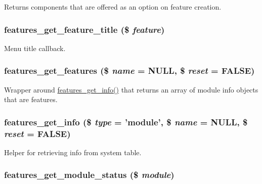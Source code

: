 \label{features_8module_a714c640c4e8c11ee30eacc1510415598}
Returns components that are offered as an option on feature creation. \hypertarget{features_8module_aa4ba0e8b4f0d7640d95ea12d67928ca3}{
\subsubsection[{features\_\-get\_\-feature\_\-title}]{\setlength{\rightskip}{0pt plus 5cm}features\_\-get\_\-feature\_\-title (\$ {\em feature})}}
\label{features_8module_aa4ba0e8b4f0d7640d95ea12d67928ca3}
Menu title callback. \hypertarget{features_8module_a2bb9e3cf366b99818c231091b8fea3cd}{
\subsubsection[{features\_\-get\_\-features}]{\setlength{\rightskip}{0pt plus 5cm}features\_\-get\_\-features (\$ {\em name} = {\ttfamily NULL}, \/  \$ {\em reset} = {\ttfamily FALSE})}}
\label{features_8module_a2bb9e3cf366b99818c231091b8fea3cd}
Wrapper around \hyperlink{features_8module_a03a83ef1f5d1e8033b71b0388e776536}{features\_\-get\_\-info()} that returns an array of module info objects that are features. \hypertarget{features_8module_a03a83ef1f5d1e8033b71b0388e776536}{
\subsubsection[{features\_\-get\_\-info}]{\setlength{\rightskip}{0pt plus 5cm}features\_\-get\_\-info (\$ {\em type} = {\ttfamily 'module'}, \/  \$ {\em name} = {\ttfamily NULL}, \/  \$ {\em reset} = {\ttfamily FALSE})}}
\label{features_8module_a03a83ef1f5d1e8033b71b0388e776536}
Helper for retrieving info from system table. \hypertarget{features_8module_ac5677f8406f4e9b5b37ae40783742a2e}{
\subsubsection[{features\_\-get\_\-module\_\-status}]{\setlength{\rightskip}{0pt plus 5cm}features\_\-get\_\-module\_\-status (\$ {\em module})}}
